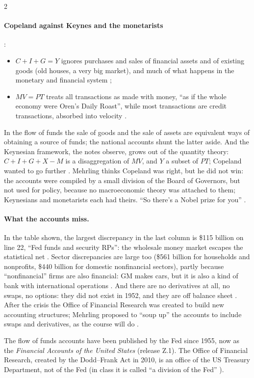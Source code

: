\begin{paracol}{2}
\paragraph{Copeland against Keynes and the monetarists} :
\begin{itemize}
  \item $C+I+G=Y$ ignores purchases and sales of financial assets and of existing goods (old houses, a very big market), and much of what
        happens in the monetary and financial system ;
  \item $MV=PT$ treats all transactions as made with money, ``as if the whole economy were Oren's Daily Roast'', while most transactions
        are credit transactions, absorbed into velocity .
\end{itemize}
In the flow of funds the sale of goods and the sale of assets are equivalent ways of obtaining a source of funds; the national accounts shunt
the latter aside. And the Keynesian framework, the notes observe, grows out of the quantity theory: $C+I+G+X-M$ is a disaggregation of $MV$, and $Y$
a subset of $PT$; Copeland wanted to go further . Mehrling thinks Copeland was right, but he did not win: the accounts were compiled by a small division of the Board of Governors, but not
used for policy, because no macroeconomic theory was attached to them; Keynesians and monetarists each had theirs. ``So there's a Nobel
prize for you'' .

\paragraph{What the accounts miss.} In the table shown, the largest discrepancy in the last column is \$115 billion on line 22, ``Fed funds
and security RPs'': the wholesale money market escapes the statistical net . Sector discrepancies are large too
(\$561 billion for households and nonprofits, \$440 billion for domestic nonfinancial sectors), partly because ``nonfinancial'' firms are
also financial: GM makes cars, but it is also a kind of bank with international operations . And there
are no derivatives at all, no swaps, no options: they did not exist in 1952, and they are off balance sheet . After the
crisis the Office of Financial Research was created to build new accounting structures; Mehrling proposed to ``soup up'' the accounts to
include swaps and derivatives, as the course will do .\begin{coursenote}
The flow of funds accounts have been published by the Fed since 1955, now as the \emph{Financial Accounts of the United States} (release
Z.1). The Office of Financial Research, created by the Dodd--Frank Act in 2010, is an office of the US Treasury Department, not of the Fed
(in class it is called ``a division of the Fed'' ).
\end{coursenote}


\end{paracol}

